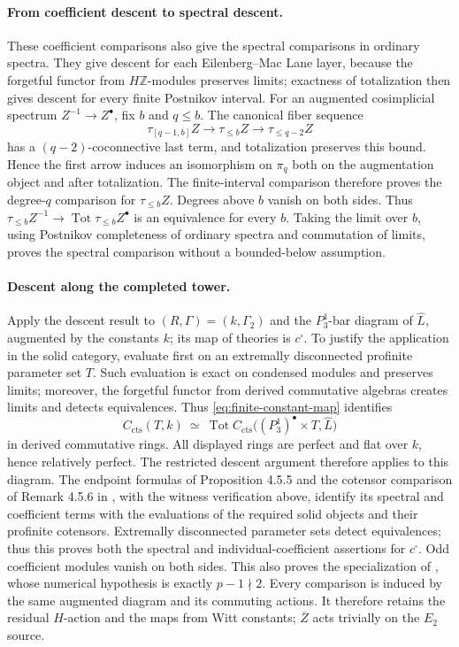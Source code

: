 \documentclass[11pt]{article}
\numberwithin{equation}{section}
\theoremstyle{definition}
\theoremstyle{remark}
\begin{document}
\paragraph{From coefficient descent to spectral descent.}
These coefficient comparisons also give the spectral comparisons in
ordinary spectra. They give descent for each Eilenberg--Mac Lane
layer, because the forgetful functor from $H\mathbb Z$-modules preserves limits;
exactness of totalization then gives descent for every finite Postnikov
interval. For an augmented cosimplicial spectrum
$Z^{-1}\to Z^\bullet$, fix $b$ and $q\leq b$. The canonical fiber sequence
\[
 \tau_{[q-1,b]}Z\longrightarrow\tau_{\leq b}Z
       \longrightarrow\tau_{\leq q-2}Z
\]
has a $(q-2)$-coconnective last term, and totalization preserves this
bound. Hence the first arrow induces an isomorphism on $\pi_q$ both on
the augmentation object and after totalization. The finite-interval
comparison therefore proves the degree-$q$ comparison for
$\tau_{\leq b}Z$. Degrees above $b$ vanish on both sides.
Thus $\tau_{\leq b}Z^{-1}\to\operatorname{Tot}\tau_{\leq b}Z^\bullet$
is an equivalence for every $b$. Taking the limit over $b$, using
Postnikov completeness of ordinary spectra and commutation of limits,
proves the spectral comparison without a bounded-below assumption.

\paragraph{Descent along the completed tower.}
Apply the descent result to \((R,\Gamma)=(k,\Gamma_2)\) and the
\(P_3^1\)-bar diagram of \(\widehat L\), augmented by the constants
\(k\); its map of theories is \(c^\square\). To justify the application
in the solid category, evaluate first on an extremally
disconnected profinite parameter set $T$.  Such evaluation is exact on
condensed modules and preserves limits; moreover, the forgetful functor
from derived commutative algebras creates limits and detects equivalences.
Thus \eqref{eq:finite-constant-map} identifies
\[
 C_{\mathrm{cts}}(T,k)\ \simeq\
 \operatorname{Tot}
 C_{\mathrm{cts}}\bigl((P_3^1)^{\bullet}\times T,\widehat L\bigr)
\]
in derived commutative rings.  All displayed rings are perfect and
flat over $k$, hence relatively perfect. The restricted descent argument
therefore applies to this diagram. The endpoint formulas of
Proposition 4.5.5 and the cotensor comparison of Remark 4.5.6 in
\cite{BMR2026}, with the witness verification above, identify its
spectral and coefficient terms with the evaluations of the required
solid objects and their profinite cotensors. Extremally
disconnected parameter sets detect equivalences; thus this proves both
the spectral and individual-coefficient assertions for \(c^\square\).
Odd coefficient modules vanish on both sides.  This also proves the
specialization of \cite[Theorem 5.2.6]{BMR2026}, whose numerical
hypothesis is exactly $p-1\nmid2$.
Every comparison is induced by the same augmented diagram and its
commuting actions. It therefore retains the residual \(H\)-action and
the maps from Witt constants; \(\overline Z\) acts trivially on the
\(E_2\) source.
\end{document}
